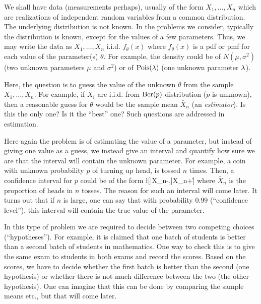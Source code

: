 \documentclass[preprint,  11pt]{amsart}
\def\sig{{\sigma}}
\begin{document}
 We shall have data (measurements perhaps), usually of the form $X_{1},\ldots ,X_{n}$ which are realizations of independent random variables  from a common distribution. The underlying distribution is not known. In the problems we consider, typically the distribution is known, except for the values of a few parameters. Thus, we may write the data as $X_{1},\ldots ,X_{n}$ i.i.d. $f_{\theta}(x)$ where $f_{\theta}(x)$ is a pdf or pmf for each value of the parameter(s) $\theta$. For example, the density could be of $N(\mu,\sig^{2})$ (two unknown parameters $\mu$ and $\sig^{2}$) or of $\mbox{Pois}(\lambda)$ (one unknown parameter $\lambda$).

 Here, the question is to guess the value of the unknown $\theta$ from the sample $X_{1},\ldots ,X_{n}$. For example, if $X_{i}$ are i.i.d. from $\mbox{Ber}(p)$ distribution ($p$ is unknown), then a reasonable guess for $\theta$ would be the sample mean $\bar{X}_{n}$ (an {\em estimator}). Is this the only one? Is it the ``best'' one? Such questions are addressed in estimation.

 Here again the problem is of estimating the value of a parameter, but instead of giving one value as a guess, we instead give an interval and quantify  how sure we are that the interval will contain the unknown parameter. For example, a coin with unknown probability $p$ of turning up head, is tossed $n$ times. Then, a confidence interval for $p$ could be of the form \ba \l[\bar{X}_{n}-,\bar{X}_{n}+\r] \ea where $\bar{X}_{n}$ is the proportion of heads in $n$ tosses. The reason for such an interval will come later. It turns out that if $n$ is large, one can say that with probability $0.99$ (``confidence level''), this interval will contain the true value of the parameter.

 In this type of problem we are required to decide between two competing choices (``hypotheses''). For example, it is claimed that one batch of students is better than a second batch of students in mathematics. One way to check this is to give the same exam to students in both exams and record the scores. Based on the scores, we have to decide whether the first batch is better than the second (one hypothesis) or whether there is not much difference between the two (the other hypothesis). One can imagine that this can be done by comparing the sample means etc., but that will come later.
\end{document}
